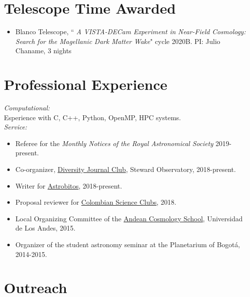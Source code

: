 \documentclass[UTF8]{article}
\begin{document}
\section*{Telescope Time Awarded}
\begin{itemize}
  \setlength\itemsep{0.0em}
  \renewcommand\labelitemi{$\cdot$}
\item Blanco Telescope, ``\textit{ A VISTA-DECam Experiment in Near-Field
  Cosmology: Search for the Magellanic Dark Matter Wake}" cycle 2020B. PI: Julio Chaname, 3 nights 
\end{itemize}

\section*{Professional Experience}
\textit{Computational:}\\
Esperience with C, C++, Python, OpenMP, HPC systems.\\

\textit{Service:} 
\begin{itemize}
  \setlength\itemsep{0.0em}
  \renewcommand\labelitemi{$\cdot$}
\item Referee for the \textit{Monthly Notices of the Royal Astronomical Society} 2019-present.
\item Co-organizer,  \href{https://www.as.arizona.edu/diversity_coffee/}{Diversity Journal Club},
  Steward Observatory, 2018-present.
\item Writer for \href{https://astrobitos.org/}{Astrobitos}, 2018-present.
\item Proposal reviewer for \href{https://clubesdeciencia.co/}{Colombian Science Clubs}, 2018.
\item Local Organizing Committee of the \href{http://forero.github.io/AndeanCosmologySchool/}{Andean Cosmology School}, Universidad de Los Andes, 2015.
\item Organizer of the student astronomy seminar at the Planetarium of Bogot\'a, 2014-2015.
\end{itemize}

\section*{Outreach}
\end{document}
